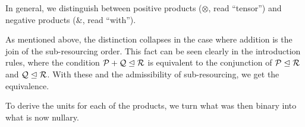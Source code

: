 In general, we distinguish between positive products ($\otimes$, read
``tensor'') and negative products ($\&$, read ``with'').

As mentioned above, the distinction collapses in the case where addition is the
join of the sub-resourcing order.
This fact can be seen clearly in the introduction rules, where the condition
$\mathcal P + \mathcal Q \trianglelefteq \mathcal R$ is equivalent to the conjunction of
$\mathcal P \trianglelefteq \mathcal R$ and $\mathcal Q \trianglelefteq \mathcal R$.
With these and the admissibility of sub-resourcing, we get the equivalence.


To derive the units for each of the products, we turn what was then binary into
what is now nullary.


